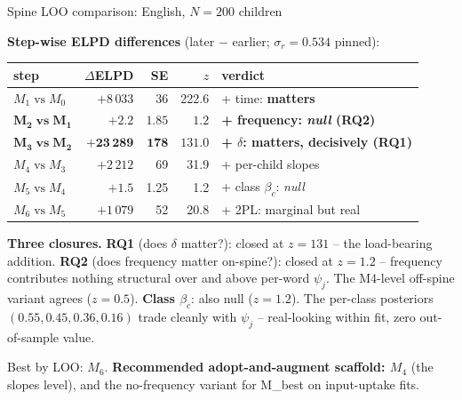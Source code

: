 \documentclass[aspectratio=169,t]{beamer}
\renewcommand{\arraystretch}{1.05}
\begin{document}
\begin{frame}{Spine LOO comparison: English, $N\!=\!200$ children}

\vspace{0.4em}
\textbf{Step-wise ELPD differences} (later $-$ earlier; $\sigma_r=0.534$ pinned):

\vspace{0.4em}
\centering
\small
\renewcommand{\arraystretch}{1.18}
\begin{tabular}{@{}lrrrl@{}}
\toprule
step & $\Delta$ELPD & SE & $z$ & verdict \\
\midrule
$M_1\;\text{vs}\;M_0$ & $+8\,033$  & 36    & 222.6 & + time: \textbf{matters} \\
$\boldsymbol{M_2\;\text{vs}\;M_1}$ & $\boldsymbol{+2.2}$ & $\boldsymbol{1.85}$ & $\boldsymbol{1.2}$ &
  \textbf{+ frequency: \emph{null} (RQ2)} \\
$\boldsymbol{M_3\;\text{vs}\;M_2}$ & $\boldsymbol{+23\,289}$ & $\boldsymbol{178}$ & $\boldsymbol{131.0}$ &
  \textbf{+ $\delta$: matters, decisively (RQ1)} \\
$M_4\;\text{vs}\;M_3$ & $+2\,212$  & 69    & 31.9  & + per-child slopes \\
$M_5\;\text{vs}\;M_4$ & $+1.5$     & 1.25  & 1.2   & + class $\beta_c$: \emph{null} \\
$M_6\;\text{vs}\;M_5$ & $+1\,079$  & 52    & 20.8  & + 2PL: marginal but real \\
\bottomrule
\end{tabular}

\vspace{0.8em}
\flushleft
\footnotesize
\textbf{Three closures.} \textbf{RQ1} (does $\delta$ matter?): closed at $z\!=\!131$ -- the
load-bearing addition. \textbf{RQ2} (does frequency matter on-spine?): closed at
$z\!=\!1.2$ -- frequency contributes nothing structural over and above per-word
$\psi_j$. The M4-level off-spine variant agrees ($z\!=\!0.5$). \textbf{Class
$\beta_c$}: also null ($z\!=\!1.2$). The per-class posteriors $(0.55, 0.45, 0.36, 0.16)$
trade cleanly with $\psi_j$ -- real-looking within fit, zero out-of-sample value.

\vspace{0.4em}
Best by LOO: $M_6$. \textbf{Recommended adopt-and-augment scaffold: $M_4$}
(the slopes level), and the no-frequency variant for M\_best on input-uptake fits.

\end{frame}
\end{document}
